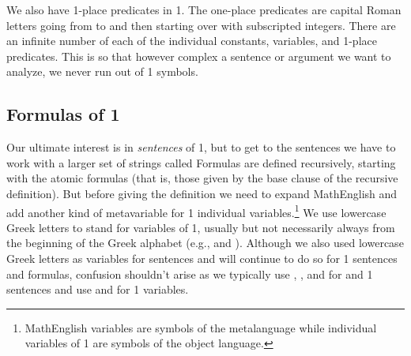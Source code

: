 We also have 1-place predicates in \GQL{}1. The one-place predicates are capital Roman letters going from  to  and then starting over with subscripted integers.  There are an infinite number of each of the individual constants, variables, and 1-place predicates. 
This is so that however complex a sentence or argument we want to analyze, we never run out of \GQL{}1 symbols.

\subsection{Formulas of \GQL{}1}\label{Formulas of GQL1}
Our ultimate interest is in \emph{sentences} of \GQL{}1, but to get to the sentences we have to work with a larger set of strings called  
Formulas are defined recursively, starting with the atomic formulas (that is, those given by the base clause of the recursive definition).  
But before giving the definition we need to expand MathEnglish and add another kind of metavariable for \GQL{}1 individual variables.\footnote{MathEnglish variables are symbols of the metalanguage while individual variables of \GQL{}1 are symbols of the object language.} 
We use lowercase Greek letters to stand for variables of \GQL{}1, usually but not necessarily always from the beginning of the Greek alphabet (e.g., \mention{$\ALPHA$} and \mention{$\BETA$}). Although we also used lowercase Greek letters as variables for \GSL{} sentences and will continue to do so for \GQL{}1 sentences and formulas, confusion shouldn't arise as we typically use \mention{$\CAPPHI$}, \mention{$\CAPPSI$}, and \mention{$\CAPTHETA$} for \GSL{} and \GQL{}1 sentences and use \mention{$\ALPHA$} and \mention{$\BETA$} for \GQL{}1 variables. 
